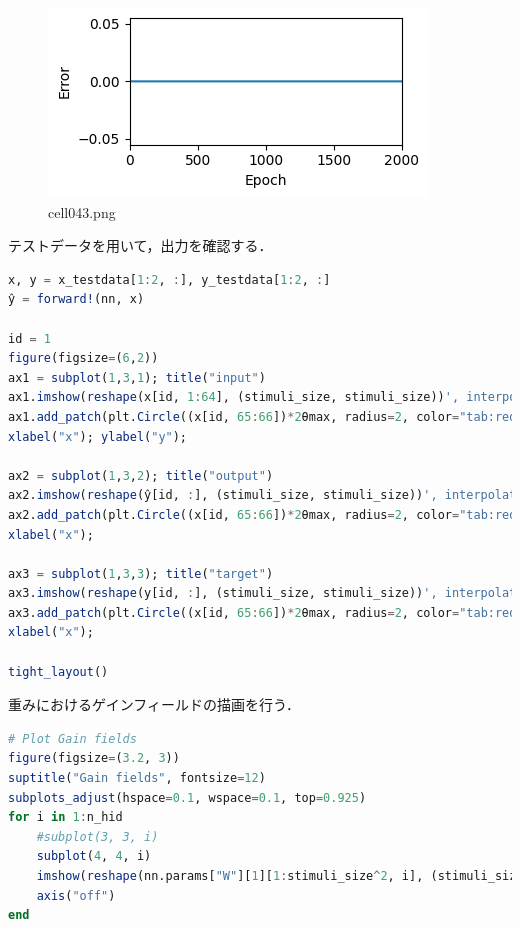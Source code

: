 \begin{figure}[ht]
	\centering
	\includegraphics[scale=0.8, max width=\linewidth]{./fig/solve-credit-assignment-problem/backpropagation/cell043.png}
	\caption{cell043.png}
	\label{cell043.png}
\end{figure}
テストデータを用いて，出力を確認する．
\begin{lstlisting}[language=julia]
x, y = x_testdata[1:2, :], y_testdata[1:2, :]
ŷ = forward!(nn, x)

id = 1
figure(figsize=(6,2))
ax1 = subplot(1,3,1); title("input")
ax1.imshow(reshape(x[id, 1:64], (stimuli_size, stimuli_size))', interpolation="gaussian", extent=[-θmax, θmax, θmax, -θmax])
ax1.add_patch(plt.Circle((x[id, 65:66])*2θmax, radius=2, color="tab:red", fill=false))
xlabel("x"); ylabel("y");

ax2 = subplot(1,3,2); title("output")
ax2.imshow(reshape(ŷ[id, :], (stimuli_size, stimuli_size))', interpolation="gaussian", extent=[-θmax, θmax, θmax, -θmax])
ax2.add_patch(plt.Circle((x[id, 65:66])*2θmax, radius=2, color="tab:red", fill=false))
xlabel("x");

ax3 = subplot(1,3,3); title("target")
ax3.imshow(reshape(y[id, :], (stimuli_size, stimuli_size))', interpolation="gaussian", extent=[-θmax, θmax, θmax, -θmax])
ax3.add_patch(plt.Circle((x[id, 65:66])*2θmax, radius=2, color="tab:red", fill=false))
xlabel("x");

tight_layout()
\end{lstlisting}
重みにおけるゲインフィールドの描画を行う．
\begin{lstlisting}[language=julia]
# Plot Gain fields
figure(figsize=(3.2, 3))
suptitle("Gain fields", fontsize=12)
subplots_adjust(hspace=0.1, wspace=0.1, top=0.925)
for i in 1:n_hid
    #subplot(3, 3, i)
    subplot(4, 4, i)
    imshow(reshape(nn.params["W"][1][1:stimuli_size^2, i], (stimuli_size, stimuli_size)), cmap="hot")
    axis("off")
end
\end{lstlisting}
